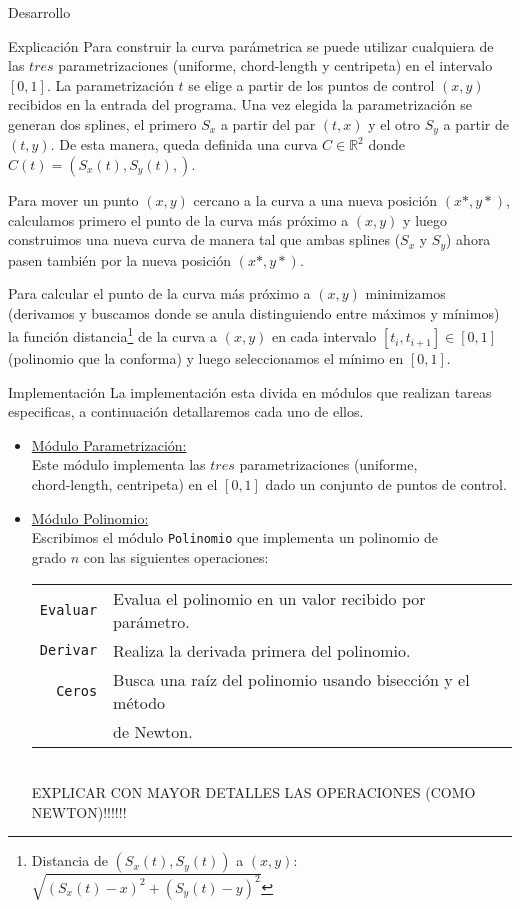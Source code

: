 \begin{section}{Desarrollo}
	\begin{subsection}{Explicación}
		Para construir la curva parámetrica se puede utilizar cualquiera de las $tres$ parametrizaciones (uniforme, chord-length y centripeta) en el intervalo
		$[0,1]$.
		La parametrización $t$ se elige a partir de los puntos de control $(x,y)$ recibidos en la entrada del programa.
		Una vez elegida la parametrización se generan dos splines, el primero $S_x$ a partir del par $(t,x)$ y el otro $S_y$ a partir de $(t,y)$.
		De esta manera, queda definida una curva $C \in \mathbb{R}^2$ donde $C(t) = (S_x(t),S_y(t),)$.
		
		Para mover un punto $(x,y)$ cercano a la curva a una nueva posición $(x*,y*)$, calculamos primero el punto de la curva más próximo a $(x,y)$ y luego
		construimos una nueva curva de manera tal que ambas splines ($S_x$ y $S_y$) ahora pasen también por la nueva posición $(x*,y*)$.
		
		Para calcular el punto de la curva más próximo a $(x,y)$ minimizamos (derivamos y buscamos donde se anula distinguiendo entre máximos y mínimos) la 
		función distancia\footnote{Distancia de $(S_x(t),S_y(t))$ a $(x,y)$: $\sqrt{(S_x(t)-x)^2+(S_y(t)-y)^2}$} de la curva a $(x,y)$ en cada intervalo
		$[t_i,t_{i+1}] \in [0,1]$ (polinomio que la conforma) y luego seleccionamos el mínimo en $[0,1]$.
	\end{subsection}
	\begin{subsection}{Implementación}
		La implementación esta divida en módulos que realizan tareas especificas, a continuación detallaremos cada uno de ellos.
		
		\begin{itemize}
			\item \underline{Módulo Parametrización:}\\
				Este módulo implementa las $tres$ parametrizaciones (uniforme,\\
				chord-length, centripeta) en el $[0,1]$ dado un conjunto de puntos de control.
			\item \underline{Módulo Polinomio:}\\
				Escribimos el módulo \texttt{Polinomio} que implementa un polinomio de\\
				grado $n$ con las siguientes operaciones:\\
				
				\begin{tabular}{rl}
					\texttt{Evaluar} & Evalua el polinomio en un valor recibido por parámetro.\\
					\texttt{Derivar} & Realiza la derivada primera del polinomio.\\
					\texttt{Ceros}   & Busca una raíz del polinomio usando bisección y el método\\
									 & de Newton.\\
				\end{tabular}\\ 
				EXPLICAR CON MAYOR DETALLES LAS OPERACIONES (COMO NEWTON)!!!!!!
		

\end{itemize}
\end{subsection}
\end{section}
